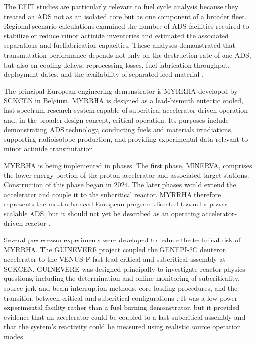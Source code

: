 The \gls{EFIT} studies are particularly relevant to fuel cycle analysis because
they treated an \gls{ADS} not as an isolated core but as one component of a broader
fleet. Regional scenario calculations examined the number of \gls{ADS} facilities
required to stabilize or reduce minor actinide inventories and estimated the
associated separations and fuelfabrication capacities. These analyses
demonstrated that transmutation performance depends not only on the
destruction rate of one \gls{ADS}, but also on cooling delays, reprocessing losses,
fuel fabrication throughput, deployment dates, and the availability of
separated feed material \cite{nea_regional_scenarios_2009}.

The principal European engineering demonstrator is \gls{MYRRHA} developed
by \gls{SCKCEN} in Belgium. \gls{MYRRHA} is designed as a lead-bismuth eutectic cooled,
fast spectrum research system capable of subcritical accelerator driven
operation and, in the broader design concept, critical operation. Its purposes
include demonstrating \gls{ADS} technology, conducting fuels and materials
irradiations, supporting radioisotope production, and providing experimental
data relevant to minor actinide transmutation
\cite{aitabderrahim_myrrha_2001,dordaImplementationStatusMyrrha2024}.

\gls{MYRRHA} is being implemented in phases. The first phase, \gls{MINERVA}, comprises
the lower-energy portion of the proton accelerator and associated target
stations. Construction of this phase began in 2024. The later phases would
extend the accelerator and couple it to the subcritical reactor. \gls{MYRRHA}
therefore represents the most advanced European program directed toward a
power scalable \gls{ADS}, but it should not yet be described as an operating
accelerator-driven reactor \cite{dordaImplementationStatusMyrrha2024}.

Several predecessor experiments were developed to reduce the technical risk
of \gls{MYRRHA}. The \gls{GUINEVERE} project coupled the \gls{GENEPI-3C} deuteron accelerator
to the \gls{VENUS-F} fast lead critical and subcritical assembly at \gls{SCKCEN}.
\gls{GUINEVERE} was designed principally to investigate reactor physics questions,
including the determination and online monitoring of subcriticality,
source jerk and beam interruption methods, core loading procedures, and the
transition between critical and subcritical configurations
\cite{billebaud_guinevere_2009,uyttenhove_experimental_2011,
marie_reactivity_2019}. It was a low-power experimental facility rather than
a fuel burning demonstrator, but it provided evidence that an accelerator
could be coupled to a fast subcritical assembly and that the system's
reactivity could be measured using realistic source operation modes.


